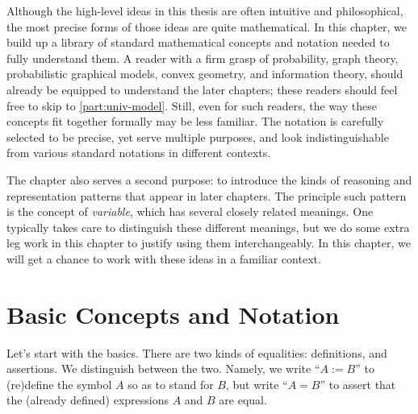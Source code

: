     \label{chap:prelim}

Although the high-level ideas in this thesis are often intuitive and philosophical, 
the most precise forms of those ideas are quite mathematical.
In this chapter, we build up a library of standard mathematical concepts and notation needed to fully understand them. 
A reader with a firm grasp of probability, graph theory, probabilistic graphical models, convex geometry, and information theory, should already be equipped to understand the later chapters;
these readers should feel free to skip to \cref{part:univ-model}.
Still, even for such readers,
the way these concepts fit together formally may be less familiar.
The notation is carefully selected to be precise,
    yet serve multiple purposes,
    and look indistinguishable 
    from various standard notations in different contexts. 
 
The chapter also serves a second purpose: 
    to introduce the kinds of reasoning and representation patterns that appear in later chapters.
%
The principle such pattern is the concept of \emph{variable}, 
which has several closely related meanings.
One typically takes care to distinguish these different meanings, 
    but we do some extra leg work in this chapter to justify using them interchangeably. 
In this chapter, we will get a chance to work with these ideas in a familiar context.


\section{Basic Concepts and Notation}

Let's start with the basics.
There are two kinds of equalities: definitions, and assertions. 
We distinguish between the two.
Namely, we write ``$A := B$'' to (re)define the symbol $A$ so as to stand for $B$,
but write ``$A = B$'' to assert that the (already defined) expressions $A$ and $B$ are equal.
%


